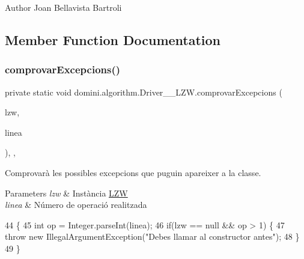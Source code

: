 \begin{DoxyAuthor}{Author}
Joan Bellavista Bartroli 
\end{DoxyAuthor}


\subsection{Member Function Documentation}
\mbox{\label{classdomini_1_1algorithm_1_1Driver____LZW_a3f609a2c3a22d0c7d11a5ff4e015e433}} 
\subsubsection{\texorpdfstring{comprovar\+Excepcions()}{comprovarExcepcions()}}
{\footnotesize\ttfamily private static void domini.\+algorithm.\+Driver\+\_\+\+\_\+\+L\+Z\+W.\+comprovar\+Excepcions (\begin{DoxyParamCaption}\item[{\hyperlink{classdomini_1_1algorithm_1_1LZW}{L\+ZW}}]{lzw,  }\item[{String}]{linea }\end{DoxyParamCaption})\hspace{0.3cm}{\ttfamily [inline]}, {\ttfamily [static]}, {\ttfamily [private]}}



Comprovarà les possibles excepcions que puguin apareixer a la classe. 


\begin{DoxyParams}{Parameters}
{\em lzw} & Instància \hyperlink{classdomini_1_1algorithm_1_1LZW}{L\+ZW} \\
\hline
{\em linea} & Número de operació realitzada \\
\hline
\end{DoxyParams}

\begin{DoxyCode}
44                                                                   \{
45         \textcolor{keywordtype}{int} op = Integer.parseInt(linea);
46         \textcolor{keywordflow}{if}(lzw == null && op > 1) \{
47             \textcolor{keywordflow}{throw} \textcolor{keyword}{new} IllegalArgumentException(\textcolor{stringliteral}{"Debes llamar al constructor antes"});
48         \}
49     \}
\end{DoxyCode}
\mbox{\label{classdomini_1_1algorithm_1_1Driver____LZW_a1500b5c33b09cbaad4645f6d87eecc4c}} 
